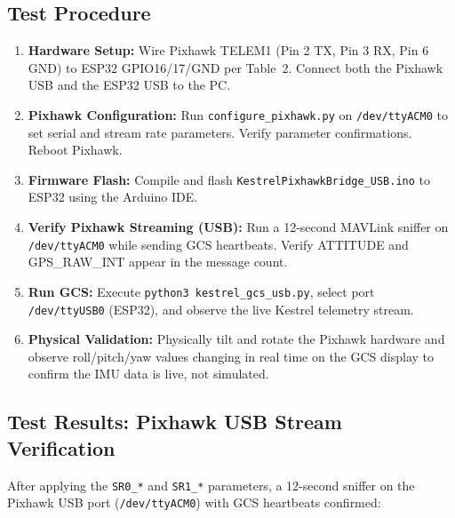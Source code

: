 \documentclass[11pt,a4paper]{article}
\begin{document}
\subsection{Test Procedure}

\begin{enumerate}
    \item \textbf{Hardware Setup:} Wire Pixhawk TELEM1 (Pin 2 TX, Pin 3 RX,
          Pin 6 GND) to ESP32 GPIO16/17/GND per Table~2. Connect both the
          Pixhawk USB and the ESP32 USB to the PC.

    \item \textbf{Pixhawk Configuration:} Run \texttt{configure\_pixhawk.py}
          on \texttt{/dev/ttyACM0} to set serial and stream rate parameters.
          Verify parameter confirmations. Reboot Pixhawk.

    \item \textbf{Firmware Flash:} Compile and flash
          \texttt{KestrelPixhawkBridge\_USB.ino} to ESP32 using the Arduino IDE.

    \item \textbf{Verify Pixhawk Streaming (USB):} Run a 12-second MAVLink
          sniffer on \texttt{/dev/ttyACM0} while sending GCS heartbeats.
          Verify ATTITUDE and GPS\_RAW\_INT appear in the message count.

    \item \textbf{Run GCS:} Execute \texttt{python3 kestrel\_gcs\_usb.py},
          select port \texttt{/dev/ttyUSB0} (ESP32), and observe the live
          Kestrel telemetry stream.

    \item \textbf{Physical Validation:} Physically tilt and rotate the Pixhawk
          hardware and observe roll/pitch/yaw values changing in real time on
          the GCS display to confirm the IMU data is live, not simulated.
\end{enumerate}

\subsection{Test Results: Pixhawk USB Stream Verification}

After applying the \texttt{SR0\_*} and \texttt{SR1\_*} parameters, a 12-second
sniffer on the Pixhawk USB port (\texttt{/dev/ttyACM0}) with GCS heartbeats
confirmed:
\end{document}

